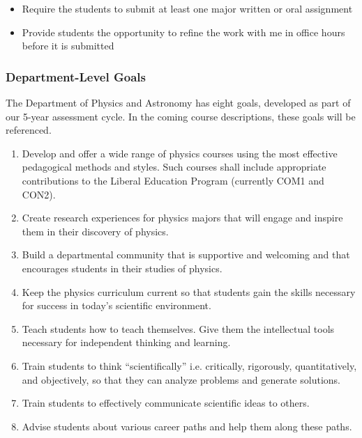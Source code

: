 \documentclass[../../main.tex]{subfiles}
\begin{document}
\begin{enumerate}
\begin{itemize}
\item Require the students to submit at least one major written or oral assignment %
\item Provide students the opportunity to refine the work with me in office hours before it is submitted %
\end{itemize}

\end{enumerate}

\subsubsection{Department-Level Goals}

The Department of Physics and Astronomy has eight goals, developed as part of our 5-year assessment cycle. In the coming course descriptions, these goals will be referenced.

\begin{enumerate}
\item Develop and offer a wide range of physics courses using the most effective pedagogical methods and styles.  Such courses shall include appropriate contributions to the Liberal Education Program (currently COM1 and CON2).
\item Create research experiences for physics majors that will engage and inspire them in their discovery of physics.
\item Build a departmental community that is supportive and welcoming and that encourages students in their studies of physics.
\item Keep the physics curriculum current so that students gain the skills necessary for success in today’s scientific environment.
\item Teach students how to teach themselves. Give them the intellectual tools necessary for independent thinking and learning.
\item Train students to think ``scientifically'' i.e. critically, rigorously, quantitatively, and objectively, so that they can analyze problems and generate solutions.
\item Train students to effectively communicate scientific ideas to others.
\item Advise students about various career paths and help them along these paths.
\end{enumerate}
\end{document}
